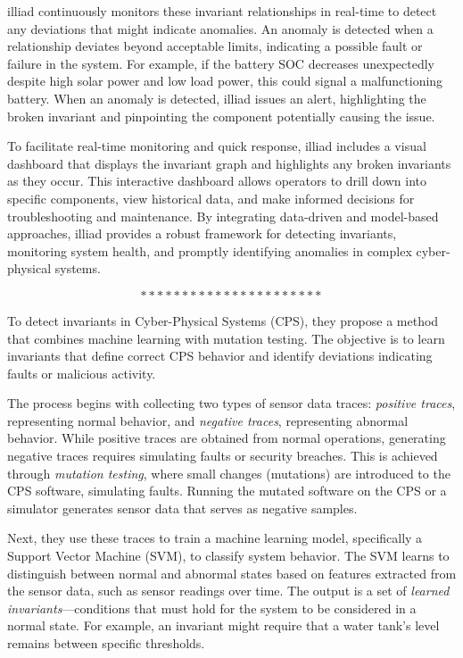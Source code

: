 illiad continuously monitors these invariant relationships in real-time to detect any deviations that might indicate anomalies. An anomaly is detected when a relationship deviates beyond acceptable limits, indicating a possible fault or failure in the system. For example, if the battery SOC decreases unexpectedly despite high solar power and low load power, this could signal a malfunctioning battery. When an anomaly is detected, illiad issues an alert, highlighting the broken invariant and pinpointing the component potentially causing the issue.

To facilitate real-time monitoring and quick response, illiad includes a visual dashboard that displays the invariant graph and highlights any broken invariants as they occur. This interactive dashboard allows operators to drill down into specific components, view historical data, and make informed decisions for troubleshooting and maintenance. By integrating data-driven and model-based approaches, illiad provides a robust framework for detecting invariants, monitoring system health, and promptly identifying anomalies in complex cyber-physical systems\cite{23}.

$$**********************$$

To detect invariants in Cyber-Physical Systems (CPS), they propose a method that combines machine learning with mutation testing. The objective is to learn invariants that define correct CPS behavior and identify deviations indicating faults or malicious activity.

The process begins with collecting two types of sensor data traces: \textit{positive traces}, representing normal behavior, and \textit{negative traces}, representing abnormal behavior. While positive traces are obtained from normal operations, generating negative traces requires simulating faults or security breaches. This is achieved through \textit{mutation testing}, where small changes (mutations) are introduced to the CPS software, simulating faults. Running the mutated software on the CPS or a simulator generates sensor data that serves as negative samples.

Next, they use these traces to train a machine learning model, specifically a Support Vector Machine (SVM), to classify system behavior. The SVM learns to distinguish between normal and abnormal states based on features extracted from the sensor data, such as sensor readings over time. The output is a set of \textit{learned invariants}—conditions that must hold for the system to be considered in a normal state. For example, an invariant might require that a water tank's level remains between specific thresholds.

